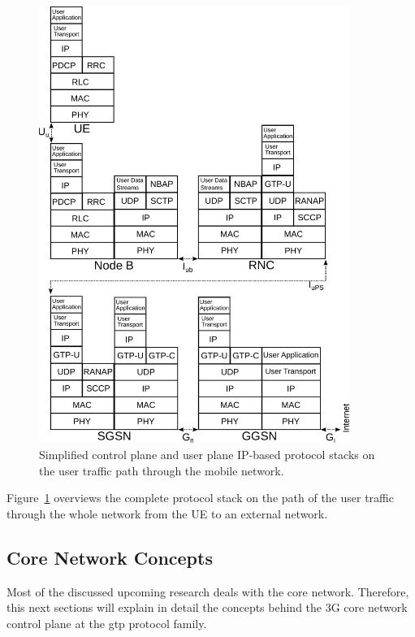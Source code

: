 \begin{figure}[htbp]
	\centering
 	\includegraphics[width=0.9\textwidth]{images/umts-userpath-stack.pdf}
 	\caption{Simplified control plane and user plane \acrshort{IP}-based protocol stacks on the user traffic path through the mobile network.}
\label{c4:fig:protocolstacks}
\end{figure}

Figure~\ref{c4:fig:protocolstacks} overviews the complete protocol stack on the path of the user traffic through the whole network from the \gls{UE} to an external network.


\subsection{Core Network Concepts}

Most of the discussed upcoming research deals with the core network. Therefore, this next sections will explain in detail the concepts behind the \gls{3G} core network control plane at the \gls{gtp} protocol family.


